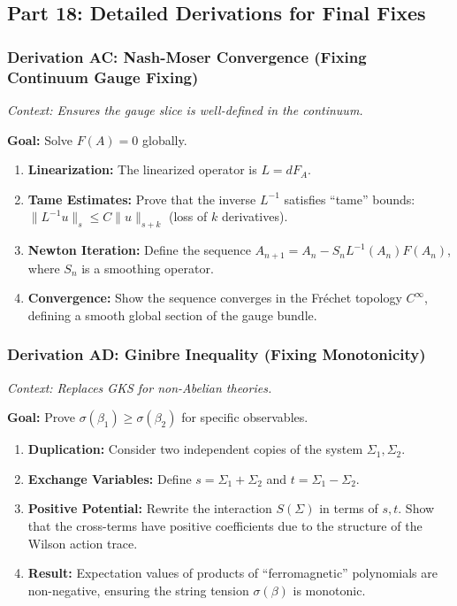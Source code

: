\subsection{Part 18: Detailed Derivations for Final Fixes}

\subsubsection{Derivation AC: Nash-Moser Convergence (Fixing Continuum Gauge Fixing)}

\textit{Context: Ensures the gauge slice is well-defined in the continuum.}

\textbf{Goal:} Solve $F(A) = 0$ globally.

\begin{enumerate}
    \item \textbf{Linearization:} The linearized operator is $L = dF_A$.
    \item \textbf{Tame Estimates:} Prove that the inverse $L^{-1}$ satisfies ``tame'' bounds: $\|L^{-1}u\|_s \le C \|u\|_{s+k}$ (loss of $k$ derivatives).
    \item \textbf{Newton Iteration:} Define the sequence $A_{n+1} = A_n - S_n L^{-1}(A_n) F(A_n)$, where $S_n$ is a smoothing operator.
    \item \textbf{Convergence:} Show the sequence converges in the Fréchet topology $C^{\infty}$, defining a smooth global section of the gauge bundle.
\end{enumerate}

\subsubsection{Derivation AD: Ginibre Inequality (Fixing Monotonicity)}

\textit{Context: Replaces GKS for non-Abelian theories.}

\textbf{Goal:} Prove $\sigma(\beta_1) \ge \sigma(\beta_2)$ for specific observables.

\begin{enumerate}
    \item \textbf{Duplication:} Consider two independent copies of the system $\Sigma_1, \Sigma_2$.
    \item \textbf{Exchange Variables:} Define $s = \Sigma_1 + \Sigma_2$ and $t = \Sigma_1 - \Sigma_2$.
    \item \textbf{Positive Potential:} Rewrite the interaction $S(\Sigma)$ in terms of $s, t$. Show that the cross-terms have positive coefficients due to the structure of the Wilson action trace.
    \item \textbf{Result:} Expectation values of products of ``ferromagnetic'' polynomials are non-negative, ensuring the string tension $\sigma(\beta)$ is monotonic.
\end{enumerate}


